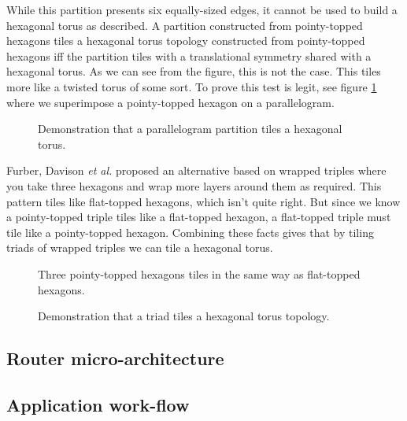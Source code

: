 			While this partition presents six equally-sized edges, it cannot be used
			to build a hexagonal torus as described. A partition constructed from
			pointy-topped hexagons tiles a hexagonal torus topology constructed from
			pointy-topped hexagons iff the partition tiles with a translational
			symmetry shared with a hexagonal torus. As we can see from the figure,
			this is not the case. This tiles more like a twisted torus of some sort.
			To prove this test is legit, see figure \ref{fig:parallelogram-tiling}
			where we superimpose a pointy-topped hexagon on a parallelogram.
			
			\begin{figure}
				\center
				
				\caption{Demonstration that a parallelogram partition tiles a hexagonal
				torus.}
				\label{fig:parallelogram-tiling}
			\end{figure}
			
			Furber, Davison \emph{et al.} \cite{davidsonWiring} proposed an
			alternative based on wrapped triples where you take three hexagons and
			wrap more layers around them as required. This pattern tiles like
			flat-topped hexagons, which isn't quite right. But since we know a
			pointy-topped triple tiles like a flat-topped hexagon, a flat-topped
			triple must tile like a pointy-topped hexagon. Combining these facts
			gives that by tiling triads of wrapped triples we can tile a hexagonal
			torus.
			
			\begin{figure}
				\center
				
				\caption{Three pointy-topped hexagons tiles in the same way as flat-topped
				hexagons.}
				\label{fig:wrapped-triple-tiling}
			\end{figure}
			
			\begin{figure}
				\center
				
				\caption{Demonstration that a triad tiles a hexagonal torus topology.}
				\label{fig:triad-tiling}
			\end{figure}
		
		\subsection{Router micro-architecture}
		\subsection{Application work-flow}
